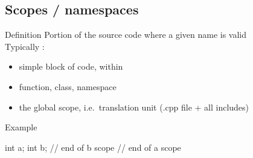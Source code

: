 \subsection[NS]{Scopes / namespaces}

\begin{frame}[fragile]
  \begin{block}{Definition}
    Portion of the source code where a given name is valid \\
    Typically :
    \begin{itemize}
    \item simple block of code, within \cppinline{{}}
    \item function, class, namespace
    \item the global scope, i.e.\ translation unit (.cpp file + all includes)
    \end{itemize}
  \end{block}
  \begin{exampleblock}{Example}
    \begin{cppcode*}{}
      { int a;
        { int b;
        } // end of b scope
      } // end of a scope
    \end{cppcode*}
  \end{exampleblock}
\end{frame}

